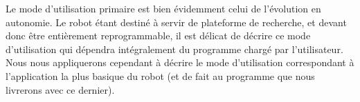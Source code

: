 		Le mode d'utilisation primaire est bien évidemment celui de l'évolution en autonomie. Le robot étant destiné à servir de plateforme de recherche, et devant donc être entièrement reprogrammable, il est délicat de décrire ce mode d'utilisation qui dépendra intégralement du programme chargé par l'utilisateur.\\

		Nous nous appliquerons cependant à décrire le mode d'utilisation correspondant à l'application la plus basique du robot (et de fait au programme que nous livrerons avec ce dernier).
		